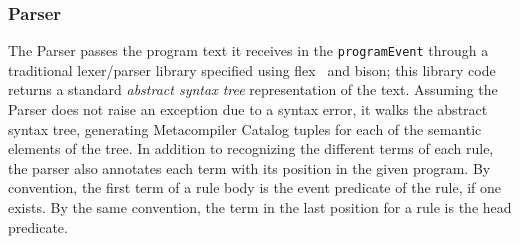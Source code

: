 \documentclass{sigmod08}
\newcommand{\ol}[1]{\texttt{\small #1}\xspace}
\begin{document}
% 
% 
% 
% 
\subsubsection{Parser}

The Parser passes the program text it receives in the \ol{programEvent}
through a traditional lexer/parser library specified using
flex~\cite{flexUrl} and bison\cite{bisonUrl}; this library code returns
a standard {\em abstract syntax tree} representation of the text.
Assuming the Parser does not raise an exception due to a syntax error,
it walks the abstract syntax tree, generating Metacompiler Catalog
tuples for each of the semantic elements of the tree. In addition to
recognizing the different terms of each rule, the parser also annotates
each term with its position in the given program.  By convention, the
first term of a rule body is the event predicate of the rule, if one
exists.  By the same convention, the term in the last position for a
rule is the head predicate.
\end{document}

